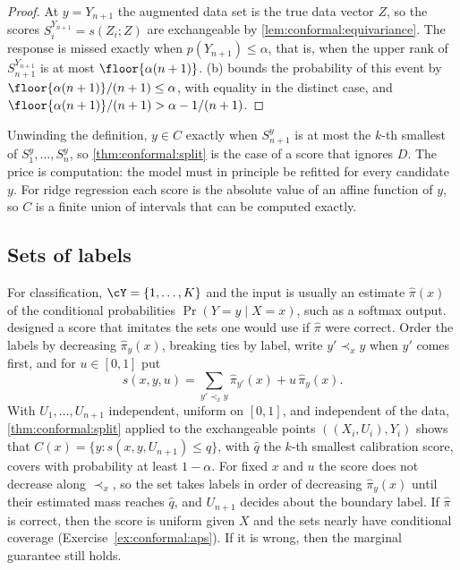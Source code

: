 \begin{refsection}
\begin{proof}
At $y=Y_{n+1}$ the augmented data set is the true data vector $Z$, so the scores $S^{Y_{n+1}}_i=s(Z_i;Z)$ are exchangeable by \cref{lem:conformal:equivariance}. The response is missed exactly when $p(Y_{n+1})\le\alpha$, that is, when the upper rank of $S^{Y_{n+1}}_{n+1}$ is at most $\floor{\alpha(n+1)}$. (b) bounds the probability of this event by $\floor{\alpha(n+1)}/(n+1)\le\alpha$, with equality in the distinct case, and $\floor{\alpha(n+1)}/(n+1)>\alpha-1/(n+1)$.
\end{proof}

Unwinding the definition, $y\in C$ exactly when $S^y_{n+1}$ is at most the $k$-th smallest of $S^y_1,\dots,S^y_n$, so \cref{thm:conformal:split} is the case of a score that ignores $D$. The price is computation: the model must in principle be refitted for every candidate $y$. For ridge regression each score is the absolute value of an affine function of $y$, so $C$ is a finite union of intervals that can be computed exactly.

\subsection{Sets of labels}

For classification, $\cY=\{1,\dots,K\}$ and the input is usually an estimate $\widehat\pi(x)$ of the conditional probabilities $\Pr(Y=y\mid X=x)$, such as a softmax output. \textcite{Romano2020} designed a score that imitates the sets one would use if $\widehat\pi$ were correct. Order the labels by decreasing $\widehat\pi_y(x)$, breaking ties by label, write $y'\prec_x y$ when $y'$ comes first, and for $u\in[0,1]$ put
\begin{equation}\label{eq:conformal:aps}
s(x,y,u)=\sum_{y'\prec_x y}\widehat\pi_{y'}(x)+u\,\widehat\pi_y(x).
\end{equation}
With $U_1,\dots,U_{n+1}$ independent, uniform on $[0,1]$, and independent of the data, \cref{thm:conformal:split} applied to the exchangeable points $((X_i,U_i),Y_i)$ shows that $C(x)=\{y : s(x,y,U_{n+1})\le\widehat q\}$, with $\widehat q$ the $k$-th smallest calibration score, covers with probability at least $1-\alpha$. For fixed $x$ and $u$ the score does not decrease along $\prec_x$, so the set takes labels in order of decreasing $\widehat\pi_y(x)$ until their estimated mass reaches $\widehat q$, and $U_{n+1}$ decides about the boundary label. If $\widehat\pi$ is correct, then the score is uniform given $X$ and the sets nearly have conditional coverage (Exercise~\ref{ex:conformal:aps}). If it is wrong, then the marginal guarantee still holds.


\end{refsection}
